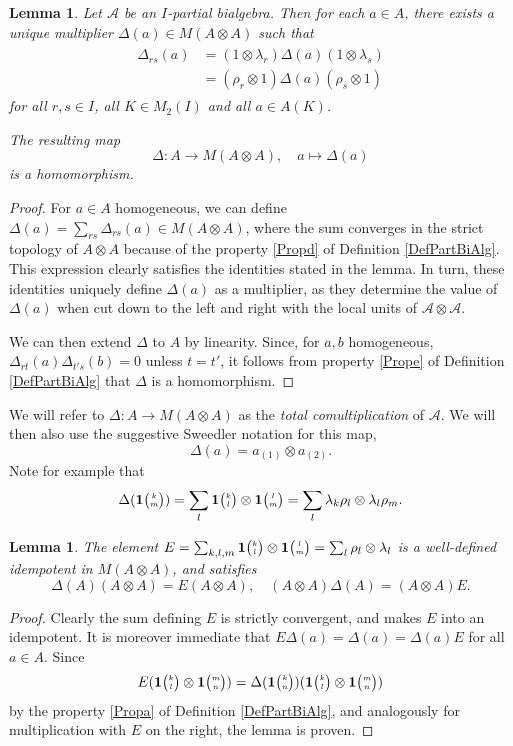 \documentclass[10pt]{article}
\newcommand{\Grt}[3]{#1{\tiny {\begin{pmatrix} #2\\#3\end{pmatrix}}}}
\newcommand{\UnitC}[2]{\Grt{\mathbf{1}}{#1}{#2}}
\newtheorem{Lem}[Theorem]{Lemma}
\theoremstyle{definition}
\numberwithin{equation}{section}
\begin{document}
\begin{Lem} Let $\mathscr{A}$ be an $I$-partial bialgebra. Then for each $a\in A$, there exists a unique multiplier $\Delta(a) \in M(A\otimes A)$ such that \begin{align}\label{EqDel}
    \begin{aligned}
      \Delta_{rs}(a) &= (1\otimes \lambda_r)\Delta(a)(1\otimes
      \lambda_s) \\ &= (\rho_r\otimes 1)\Delta(a)(\rho_s\otimes 1)
    \end{aligned}
\end{align}  for all $r,s\in I$, all $K\in M_2(I)$ and all $a\in A(K)$. 

The resulting map \[\Delta:A\rightarrow M(A\otimes A),\quad a\mapsto \Delta(a)\] is a homomorphism.
\end{Lem} 
\begin{proof} For $a\in A$ homogeneous, we can define $\Delta(a) = \sum_{rs} \Delta_{rs}(a) \in M(A\otimes A)$, where the sum converges in the strict topology of $A\otimes A$ because of the property \ref{Propd} of Definition \ref{DefPartBiAlg}. This expression clearly satisfies the identities stated in the lemma. In turn, these identities uniquely define $\Delta(a)$ as a multiplier, as they determine the value of $\Delta(a)$ when cut down to the left and right with the local units of $\mathscr{A}\otimes \mathscr{A}$.

We can then extend $\Delta$ to $A$ by linearity. Since, for $a,b$ homogeneous, $\Delta_{rt}(a)\Delta_{t's}(b)=0$ unless $t=t'$, it follows from property \ref{Prope} of Definition \ref{DefPartBiAlg} that $\Delta$ is a homomorphism. 
\end{proof}

We will refer to $\Delta: A\rightarrow M(A\otimes A)$ as the \emph{total comultiplication} of $\mathscr{A}$. We will then also use the suggestive Sweedler notation for this map, \[\Delta(a) = a_{(1)}\otimes a_{(2)}.\] Note for example that \[\Delta(\UnitC{k}{m}) = \sum_{l}\UnitC{k}{l}\otimes \UnitC{l}{m} = \sum_l \lambda_k\rho_l\otimes \lambda_l\rho_m.\]

\begin{Lem} The element $E = \sum_{k,l,m} \UnitC{k}{l}\otimes \UnitC{l}{m}= \sum_l \rho_l\otimes \lambda_l$ is a well-defined idempotent in $M(A\otimes A)$, and satisfies \[\Delta(A)(A\otimes A)=E(A\otimes A),\quad (A\otimes A)\Delta(A)= (A\otimes A)E.\]
\end{Lem} 
\begin{proof} Clearly the sum defining $E$ is strictly convergent, and makes $E$ into an idempotent. It is moreover immediate that $E\Delta(a)=\Delta(a) = \Delta(a)E$ for all $a\in A$. Since \[E(\UnitC{k}{l}\otimes \UnitC{m}{n}) = \Delta(\UnitC{k}{n})(\UnitC{k}{l}\otimes \UnitC{m}{n}) \] by the property \ref{Propa} of Definition \ref{DefPartBiAlg}, and analogously for multiplication with $E$ on the right, the lemma is proven. 
\end{proof} 
\end{document}
